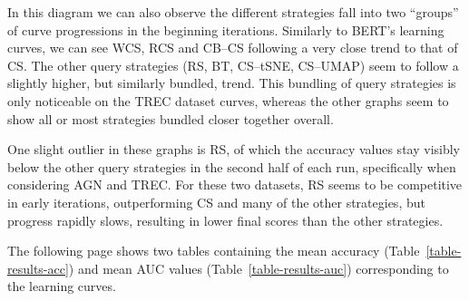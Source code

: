 \documentclass[english,bachelor,ul]{webisthesis} %
\begin{document}
In this diagram we can also observe the different strategies fall into two ``groups'' of curve progressions in the beginning iterations. Similarly to BERT's learning curves, we can see WCS, RCS and CB--CS following a very close trend to that of CS. The other query strategies (RS, BT, CS--tSNE, CS--UMAP) seem to follow a slightly higher, but similarly bundled, trend. This bundling of query strategies is only noticeable on the TREC dataset curves, whereas the other graphs seem to show all or most strategies bundled closer together overall.

One slight outlier in these graphs is RS, of which the accuracy values stay visibly below the other query strategies in the second half of each run, specifically when considering AGN and TREC. For these two datasets, RS seems to be competitive in early iterations, outperforming CS and many of the other strategies, but progress rapidly slows, resulting in lower final scores than the other strategies.


The following page shows two tables containing the mean accuracy (Table~\ref{table-results-acc}) and mean AUC values (Table~\ref{table-results-auc}) corresponding to the learning curves. 

\clearpage \newpage
\end{document}
